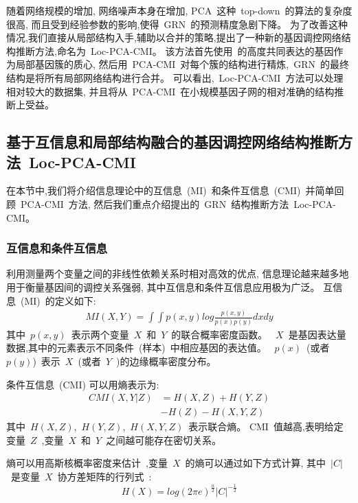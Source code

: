 随着网络规模的增加, 网络噪声本身在增加,
PCA~这种~top-down~的算法的复杂度很高, 而且受到经验参数的影响,使得~GRN~的预测精度急剧下降。
为了改善这种情况,我们直接从局部结构入手,辅助以合并的策略,提出了一种新的基因调控网络结构推断方法,命名为~Loc-PCA-CMI。
该方法首先使用~的高度共同表达的基因作为局部基因簇的质心,
然后用~PCA-CMI~对每个簇的结构进行精炼,~GRN~的最终结构是将所有局部网络结构进行合并。
可以看出,~Loc-PCA-CMI~方法可以处理相对较大的数据集,
并且将从~PCA-CMI~在小规模基因子网的相对准确的结构推断上受益。

\subsection{基于互信息和局部结构融合的基因调控网络结构推断方法~Loc-PCA-CMI}
在本节中,我们将介绍信息理论中的互信息~(MI)~和条件互信息~(CMI)~并简单回顾~PCA-CMI~方法,
然后我们重点介绍提出的~GRN~结构推断方法~Loc-PCA-CMI。

\subsubsection{互信息和条件互信息}
\label{relatedwork}
利用测量两个变量之间的非线性依赖关系时相对高效的优点,
信息理论越来越多地用于衡量基因间的调控关系强弱, 其中互信息和条件互信息应用极为广泛。
互信息~(MI)~的定义如下:
\begin{align} %
    MI(X,Y)=\int \int p(x,y)log \frac{p(x,y)}{p(x)p(y)}dxdy
 \end{align}
 其中~$p(x,y)$~表示两个变量~$X$~和~$Y$~的联合概率密度函数。
~$X$~是基因表达量数据,其中的元素表示不同条件~(样本)~中相应基因的表达值。
~$p(x)$~(或者~$p(y)$)~表示~$X$~(或者~$Y$~)的边缘概率密度分布。

条件互信息~(CMI) 可以用熵表示为:
\begin{equation}
\begin{split}
CMI(X,Y|Z) &= H(X,Z) + H(Y,Z)\\
               & - H(Z) - H(X,Y,Z)
\end{split}
\end{equation}
其中~$H(X,Z)$,~$H(Y,Z)$,~$H(X,Y,Z)$~表示联合熵。
CMI~值越高,表明给定变量~$Z$~,变量~$X$~和~$Y$~之间越可能存在密切关系。

熵可以用高斯核概率密度来估计~\cite{basso2005reverse},变量~$X$~的熵可以通过如下方式计算, 
其中~$|C|$~是变量~$X$~协方差矩阵的行列式~\cite{zhang2011inferring}:
\begin{equation}
    H(X) = log(2\pi e )^\frac{n}{2} |C| ^ {-\frac{1}{2}}
\end{equation}

